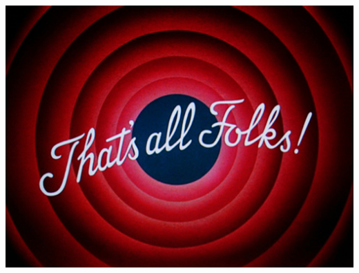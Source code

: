 \documentclass[12pt,t]{beamer}
\renewcommand{\emph}[1]{{\color{red}#1}}
\theoremstyle{plain}
\theoremstyle{definition}
\begin{document}
%
%
%
%
%
%
%
%

\begingroup
\makeatletter
\setlength{\hoffset}{-1\beamer@sidebarwidth}
\makeatother
\begin{frame}[plain]
\begin{center}
\includegraphics[width=1.2\linewidth]{thats-all-folks}
\end{center}
\end{frame}
\endgroup
\end{document}
